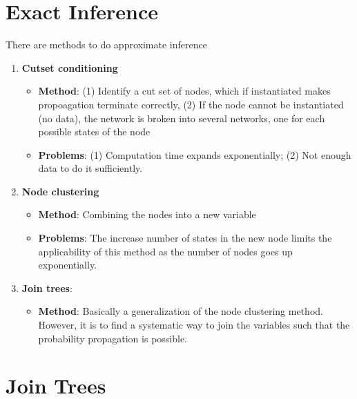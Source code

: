 \documentclass[12pt,twoside]{article}
\begin{document}
\section{Exact Inference}
There are methods to do approximate inference
	\begin{enumerate}
		\item \textbf{Cutset conditioning}
		\begin{itemize}
			\item \textbf{Method}: (1) Identify a cut set of nodes, which if instantiated makes propoagation terminate correctly, (2) If the node cannot be instantiated (no data), the network is broken into several networks, one for each possible states of the node		
			\item \textbf{Problems}: (1) Computation time expands exponentially; (2) Not enough data to do it sufficiently.
		\end{itemize}
			
		\item \textbf{Node clustering}
		\begin{itemize}
			\item \textbf{Method}: Combining the nodes into a new variable
			\item \textbf{Problems}: The increase number of states in the new node limits the applicability of this method as the number of nodes goes up exponentially.
		\end{itemize}				
		
		\item \textbf{Join trees}: 
		\begin{itemize}
			\item \textbf{Method}: Basically a generalization of the node clustering method. However, it is to find a systematic way to join the variables such that the probability propagation is possible.
		\end{itemize}
	\end{enumerate}

\newpage

\section{Join Trees}
\end{document}
